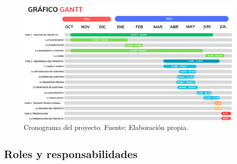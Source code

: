 \documentclass[a4paper, 10pt]{article}
\begin{document}
\clearpage
\begin{landscape}
\begin{figure}[H]
    \centering
    \includegraphics[width=24cm]{images/gant.png}
    \caption{Cronograma del proyecto. Fuente: Elaboración propia.}
    \label{fig:cronograma}
\end{figure}
\end{landscape}
\clearpage


\subsection{Roles y responsabilidades}
\end{document}
